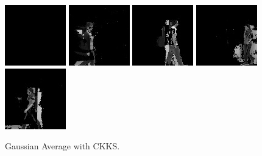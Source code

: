 \begin{subfigure}[t]{0.9\textwidth}
    \centering
    \includegraphics[scale=0.7]{figures/LASIESTA-CKKS-GAUSSIAN/frame0}
    \hfill
    \includegraphics[scale=0.7]{figures/LASIESTA-CKKS-GAUSSIAN/frame100}
    \hfill
    \includegraphics[scale=0.7]{figures/LASIESTA-CKKS-GAUSSIAN/frame190}
    \hfill
    \includegraphics[scale=0.7]{figures/LASIESTA-CKKS-GAUSSIAN/frame250}
    \hfill
    \includegraphics[scale=0.7]{figures/LASIESTA-CKKS-GAUSSIAN/frame270}
    \caption{Gaussian Average with CKKS.}
\end{subfigure}%
\setcounter{subfigure}{1}
\renewcommand\thesubfigure{\alph{subfigure}}
